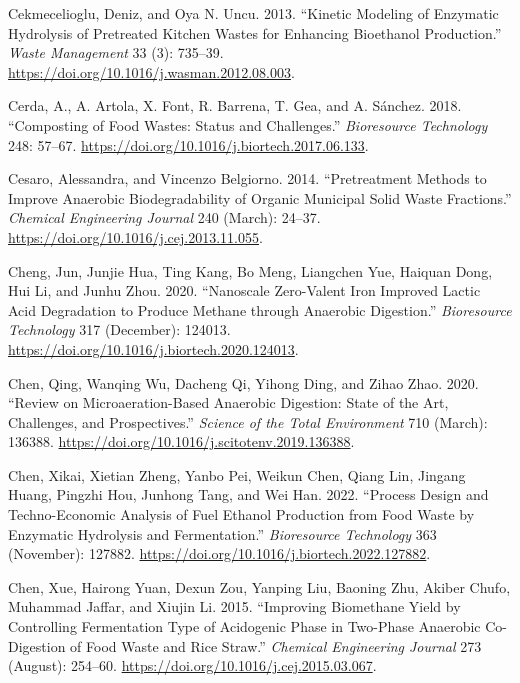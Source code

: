 \documentclass[11pt]{report}
\begin{document}
\begin{hangparas}{1.5em}{1}
\hypertarget{citeproc_bib_item_9}{Cekmecelioglu, Deniz, and Oya N. Uncu. 2013. “Kinetic Modeling of Enzymatic Hydrolysis of Pretreated Kitchen Wastes for Enhancing Bioethanol Production.” \textit{Waste Management} 33 (3): 735–39. \url{https://doi.org/10.1016/j.wasman.2012.08.003}.}

\hypertarget{citeproc_bib_item_10}{Cerda, A., A. Artola, X. Font, R. Barrena, T. Gea, and A. Sánchez. 2018. “Composting of Food Wastes: Status and Challenges.” \textit{Bioresource Technology} 248: 57–67. \url{https://doi.org/10.1016/j.biortech.2017.06.133}.}

\hypertarget{citeproc_bib_item_11}{Cesaro, Alessandra, and Vincenzo Belgiorno. 2014. “Pretreatment Methods to Improve Anaerobic Biodegradability of Organic Municipal Solid Waste Fractions.” \textit{Chemical Engineering Journal} 240 (March): 24–37. \url{https://doi.org/10.1016/j.cej.2013.11.055}.}

\hypertarget{citeproc_bib_item_12}{Cheng, Jun, Junjie Hua, Ting Kang, Bo Meng, Liangchen Yue, Haiquan Dong, Hui Li, and Junhu Zhou. 2020. “Nanoscale Zero-Valent Iron Improved Lactic Acid Degradation to Produce Methane through Anaerobic Digestion.” \textit{Bioresource Technology} 317 (December): 124013. \url{https://doi.org/10.1016/j.biortech.2020.124013}.}

\hypertarget{citeproc_bib_item_13}{Chen, Qing, Wanqing Wu, Dacheng Qi, Yihong Ding, and Zihao Zhao. 2020. “Review on Microaeration-Based Anaerobic Digestion: State of the Art, Challenges, and Prospectives.” \textit{Science of the Total Environment} 710 (March): 136388. \url{https://doi.org/10.1016/j.scitotenv.2019.136388}.}

\hypertarget{citeproc_bib_item_14}{Chen, Xikai, Xietian Zheng, Yanbo Pei, Weikun Chen, Qiang Lin, Jingang Huang, Pingzhi Hou, Junhong Tang, and Wei Han. 2022. “Process Design and Techno-Economic Analysis of Fuel Ethanol Production from Food Waste by Enzymatic Hydrolysis and Fermentation.” \textit{Bioresource Technology} 363 (November): 127882. \url{https://doi.org/10.1016/j.biortech.2022.127882}.}

\hypertarget{citeproc_bib_item_15}{Chen, Xue, Hairong Yuan, Dexun Zou, Yanping Liu, Baoning Zhu, Akiber Chufo, Muhammad Jaffar, and Xiujin Li. 2015. “Improving Biomethane Yield by Controlling Fermentation Type of Acidogenic Phase in Two-Phase Anaerobic Co-Digestion of Food Waste and Rice Straw.” \textit{Chemical Engineering Journal} 273 (August): 254–60. \url{https://doi.org/10.1016/j.cej.2015.03.067}.}


\end{hangparas}
\end{document}
